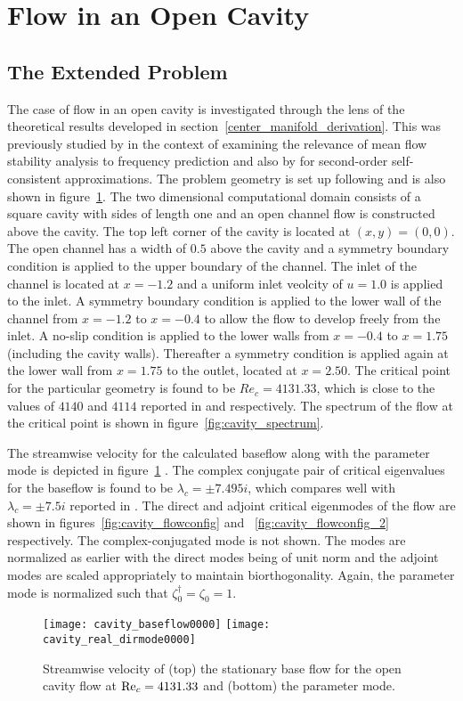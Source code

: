 \section{Flow in an Open Cavity}
\label{application_cavity}

\subsection{The Extended Problem}

The case of flow in an open cavity is investigated through the lens of the theoretical results developed in section~\ref{center_manifold_derivation}. This was previously studied by \cite{sipp07} in the context of examining the relevance of mean flow stability analysis to frequency prediction and also by \cite{meliga17} for second-order self-consistent approximations. The problem geometry is set up following \cite{sipp07} and is also shown in figure~\ref{fig:cavity_base_param}. The two dimensional computational domain consists of a square cavity with sides of length one and an open channel flow is constructed above the cavity. The top left corner of the cavity is located at $(x,y)=(0,0)$. The open channel has a width of $0.5$ above the cavity and a symmetry boundary condition is applied to the upper boundary of the channel. The inlet of the channel is located at $x=-1.2$ and a uniform inlet veolcity of $u=1.0$ is applied to the inlet. 
A symmetry boundary condition is applied to the lower wall of the channel from $x=-1.2$ to $x=-0.4$ to allow the flow to develop freely from the inlet. A no-slip condition is applied to the lower walls from $x=-0.4$ to $x=1.75$ (including the cavity walls). Thereafter a symmetry condition is applied again at the lower wall from $x=1.75$ to the outlet, located at $x=2.50$. The critical point for the particular geometry is found to be $Re_{c}=4131.33$, which is close to the values of $4140$ and $4114$ reported in \cite{sipp07} and \cite{meliga17} respectively. The spectrum of the flow at the critical point is shown in figure~\ref{fig:cavity_spectrum}. 

The streamwise velocity for the calculated baseflow along with the parameter mode is depicted in figure~\ref{fig:cavity_base_param} . The complex conjugate pair of critical eigenvalues for the baseflow is found to be $\lambda_{c} = \pm7.495i$, which compares well with $\lambda_{c}=\pm7.5i$ reported in \cite{sipp07}. The direct and adjoint critical eigenmodes of the flow are shown in figures~\ref{fig:cavity_flowconfig} and ~\ref{fig:cavity_flowconfig_2} respectively. The complex-conjugated mode is not shown. The modes are normalized as earlier with the direct modes being of unit norm and the adjoint modes are scaled appropriately to maintain biorthogonality. Again, the parameter mode is normalized such that $\zeta^{\dagger}_{0} = \zeta_{0} = 1$.
\begin{figure}
	\centering
	\texttt{[image: cavity\_baseflow0000]}
	\texttt{[image: cavity\_real\_dirmode0000]}
	\caption{Streamwise velocity of (top) the stationary base flow for the open cavity flow at $\mathrm{Re}_{c}=4131.33$ and (bottom) the parameter mode.}
	\label{fig:cavity_base_param}
\end{figure}	

